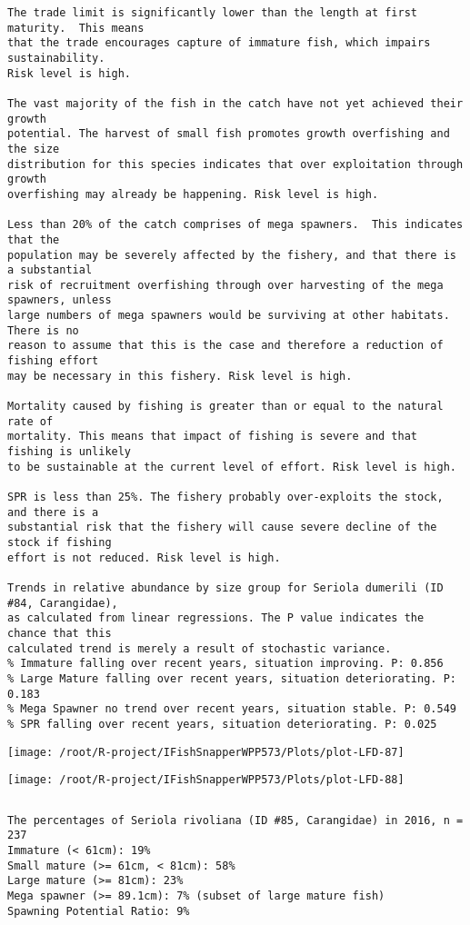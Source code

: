 \documentclass{report}\usepackage[]{graphicx}\usepackage[]{color}
\makeatletter
\def\maxwidth{ %
  \ifdim\Gin@nat@width>\linewidth
    \linewidth
  \else
    \Gin@nat@width
  \fi
}
\newenvironment{kframe}{%
 \def\at@end@of@kframe{}%
 \ifinner\ifhmode%
  \def\at@end@of@kframe{\end{minipage}}%
  \begin{minipage}{\columnwidth}%
 \fi\fi%
 \def\FrameCommand##1{\hskip\@totalleftmargin \hskip-\fboxsep
 \colorbox{shadecolor}{##1}\hskip-\fboxsep
     \hskip-\linewidth \hskip-\@totalleftmargin \hskip\columnwidth}%
 \MakeFramed {\advance\hsize-\width
   \@totalleftmargin\z@ \linewidth\hsize
   \@setminipage}}%
 {\par\unskip\endMakeFramed%
 \at@end@of@kframe}
\newenvironment{knitrout}{}{} %
\makeatother
\begin{document}
\begin{knitrout}
\begin{kframe}
\begin{verbatim}
The trade limit is significantly lower than the length at first maturity.  This means
that the trade encourages capture of immature fish, which impairs sustainability.
Risk level is high.

The vast majority of the fish in the catch have not yet achieved their growth
potential. The harvest of small fish promotes growth overfishing and the size
distribution for this species indicates that over exploitation through growth
overfishing may already be happening. Risk level is high.

Less than 20% of the catch comprises of mega spawners.  This indicates that the
population may be severely affected by the fishery, and that there is a substantial
risk of recruitment overfishing through over harvesting of the mega spawners, unless
large numbers of mega spawners would be surviving at other habitats. There is no
reason to assume that this is the case and therefore a reduction of fishing effort
may be necessary in this fishery. Risk level is high.
 
Mortality caused by fishing is greater than or equal to the natural rate of
mortality. This means that impact of fishing is severe and that fishing is unlikely
to be sustainable at the current level of effort. Risk level is high.
 
SPR is less than 25%. The fishery probably over-exploits the stock, and there is a
substantial risk that the fishery will cause severe decline of the stock if fishing
effort is not reduced. Risk level is high.
 
Trends in relative abundance by size group for Seriola dumerili (ID #84, Carangidae),
as calculated from linear regressions. The P value indicates the chance that this
calculated trend is merely a result of stochastic variance.
% Immature falling over recent years, situation improving. P: 0.856
% Large Mature falling over recent years, situation deteriorating. P: 0.183
% Mega Spawner no trend over recent years, situation stable. P: 0.549
% SPR falling over recent years, situation deteriorating. P: 0.025
\end{verbatim}
\end{kframe}
\texttt{[image: /root/R-project/IFishSnapperWPP573/Plots/plot-LFD-87]} 

\texttt{[image: /root/R-project/IFishSnapperWPP573/Plots/plot-LFD-88]} 
\begin{kframe}\begin{verbatim}
\end{verbatim}
\end{kframe}
\clearpage
\newpage
\begin{kframe}\begin{verbatim}The percentages of Seriola rivoliana (ID #85, Carangidae) in 2016, n = 237
Immature (< 61cm): 19%
Small mature (>= 61cm, < 81cm): 58%
Large mature (>= 81cm): 23%
Mega spawner (>= 89.1cm): 7% (subset of large mature fish)
Spawning Potential Ratio: 9%
 

\end{verbatim}
\end{kframe}
\end{knitrout}
\end{document}
